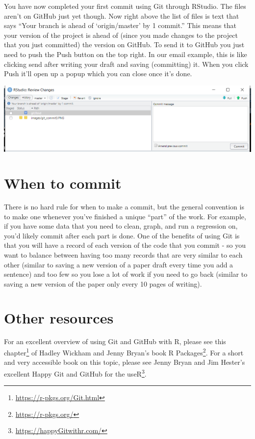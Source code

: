 \documentclass[
]{krantz}
\renewcommand{\href}[2]{#2\footnote{\url{#1}}}
\begin{document}
You have now completed your first commit using Git through RStudio. The files aren't on GitHub just yet though. Now right above the list of files is text that says ``Your branch is ahead of `origin/master' by 1 commit.'' This means that your version of the project is ahead of (since you made changes to the project that you just committed) the version on GitHub. To send it to GitHub you just need to push the Push button on the top right. In our email example, this is like clicking send after writing your draft and saving (committing) it. When you click Push it'll open up a popup which you can close once it's done.

\includegraphics{images/git_commit4.PNG}

\hypertarget{when-to-commit}{%
\section{When to commit}\label{when-to-commit}}

There is no hard rule for when to make a commit, but the general convention is to make one whenever you've finished a unique ``part'' of the work. For example, if you have some data that you need to clean, graph, and run a regression on, you'd likely commit after each part is done. One of the benefits of using Git is that you will have a record of each version of the code that you commit - so you want to balance between having too many records that are very similar to each other (similar to saving a new version of a paper draft every time you add a sentence) and too few so you lose a lot of work if you need to go back (similar to saving a new version of the paper only every 10 pages of writing).

\hypertarget{other-resources}{%
\section{Other resources}\label{other-resources}}

For an excellent overview of using Git and GitHub with R, please see \href{https://r-pkgs.org/Git.html}{this chapter} of Hadley Wickham and Jenny Bryan's book \href{https://r-pkgs.org/}{R Packages}. For a short and very accessible book on this topic, please see Jenny Bryan and Jim Hester's excellent \href{https://happyGitwithr.com/}{Happy Git and GitHub for the useR}.
\end{document}
